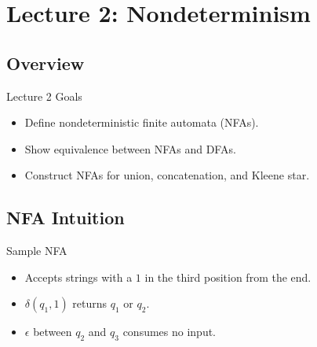 \documentclass[aspectratio=169]{beamer}
\begin{document}
\section{Lecture 2: Nondeterminism}

\subsection{Overview}

\begin{frame}{Lecture 2 Goals}
  \begin{itemize}
    \item Define nondeterministic finite automata (NFAs).
    \item Show equivalence between NFAs and DFAs.
    \item Construct NFAs for union, concatenation, and Kleene star.
  \end{itemize}
\end{frame}

\subsection{NFA Intuition}

\begin{frame}{Sample NFA}
  \begin{center}
  \end{center}
  \begin{itemize}
    \item Accepts strings with a $1$ in the third position from the end.
    \item $\delta(q_1,1)$ returns $q_1$ or $q_2$.
    \item $\epsilon$ between $q_2$ and $q_3$ consumes no input.
  \end{itemize}
\end{frame}
\end{document}
